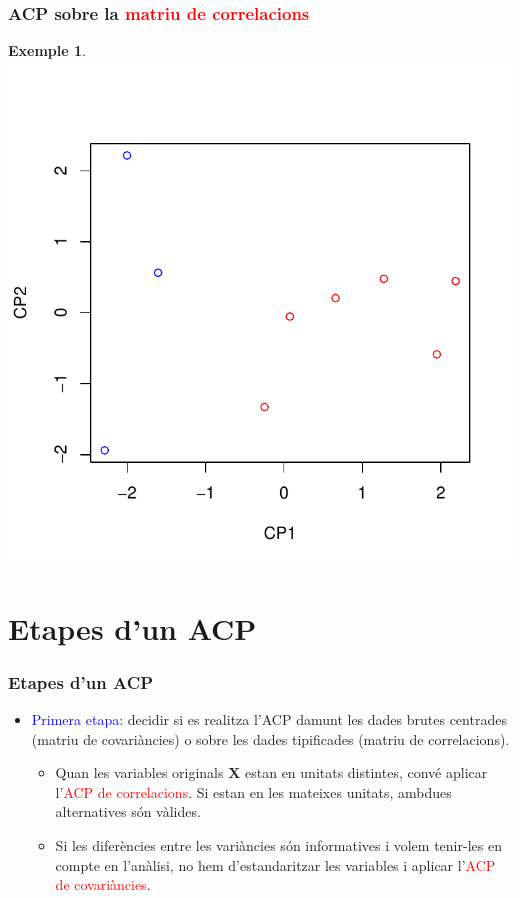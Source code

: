 \documentclass[12pt,t]{beamer}
\newcommand{\red}[1]{\textcolor{red}{#1}}
\newcommand{\blue}[1]{\textcolor{blue}{#1}}
\theoremstyle{plain}
\theoremstyle{definition}
\newtheorem{exemple}{Exemple}
\begin{document}
\begin{frame}
\frametitle{ACP sobre la \red{matriu de correlacions}}
\begin{exemple}
\vspace*{-1cm}

\includegraphics{ACP-051}
\end{exemple}
\end{frame}

\section{Etapes d'un ACP}

\begin{frame}
\frametitle{Etapes d'un ACP}
\begin{itemize}
\item \blue{Primera etapa:} decidir si es realitza l'ACP damunt les dades brutes centrades (matriu de covariàncies) o sobre les dades tipificades (matriu de correlacions).
\begin{itemize}
\item Quan les variables originals $\mathbf{X}$ estan en unitats distintes, convé aplicar l'\red{ACP de correlacions}. Si estan en les mateixes unitats, ambdues alternatives són vàlides.
\item Si les diferències entre les variàncies són informatives i volem tenir-les en compte en l'anàlisi, no hem d'estandaritzar les variables i aplicar l'\red{ACP de covariàncies}.
\end{itemize}
\end{itemize}
\end{frame}
\end{document}
